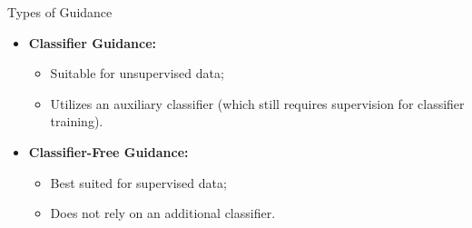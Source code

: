\documentclass{beamer}
\begin{document}
\begin{frame}{Types of Guidance}
	\begin{itemize}
		\item \textbf{Classifier Guidance:} 
			\begin{itemize}
				\item Suitable for unsupervised data;
				\item Utilizes an auxiliary classifier (which still requires supervision for classifier training).
			\end{itemize}
		\item \textbf{Classifier-Free Guidance:} 
			\begin{itemize}
				\item Best suited for supervised data;
				\item Does not rely on an additional classifier.
			\end{itemize}
	\end{itemize}
\end{frame}
\end{document}
